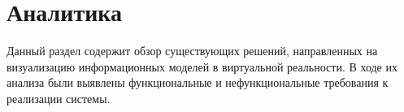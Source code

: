 ﻿\section{Аналитика}
\label{sections:Analytics}

Данный раздел содержит обзор существующих решений,
направленных на визуализацию информационных моделей в виртуальной реальности.
В ходе их анализа были выявлены функциональные и нефункциональные требования
к реализации системы. 



